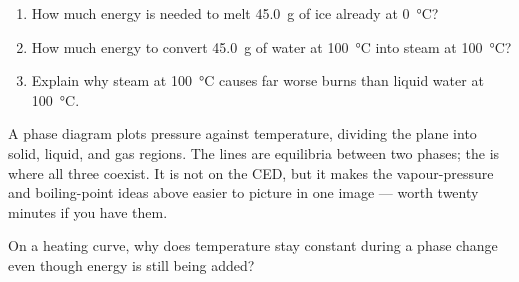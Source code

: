 \documentclass{apchem-notes}
\begin{document}

\begin{enumerate}[leftmargin=*,itemsep=0.4em]
  \item How much energy is needed to melt \SI{45.0}{\gram} of ice already at
        \SI{0}{\celsius}? \workspace[1.8cm]
  \item How much energy to convert \SI{45.0}{\gram} of water at
        \SI{100}{\celsius} into steam at \SI{100}{\celsius}?
  \item Explain why steam at \SI{100}{\celsius} causes far worse burns than
        liquid water at \SI{100}{\celsius}.
\end{enumerate}

\begin{apcnote}
A phase diagram plots pressure against temperature, dividing the plane into
solid, liquid, and gas regions. The lines are equilibria between two phases;
the  is where all three coexist. It is not on the CED,
but it makes the vapour-pressure and boiling-point ideas above easier to
picture in one image --- worth twenty minutes if you have them.
\end{apcnote}

\begin{exitticket}
On a heating curve, why does temperature stay constant during a phase
change even though energy is still being added?
\end{exitticket}
\end{document}
